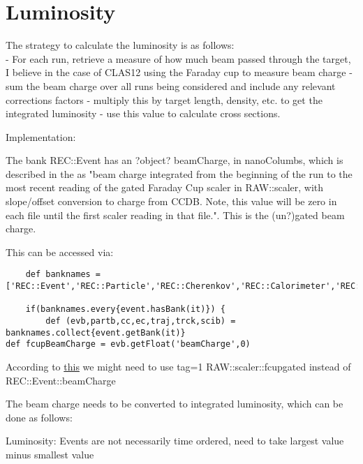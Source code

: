 \section{Luminosity}

The strategy to calculate the luminosity is as follows:\\

 - For each run, retrieve a measure of how much beam passed through the target, I believe in the case of CLAS12 using the Faraday cup to measure beam charge
    - sum the beam charge over all runs being considered and include any relevant corrections factors
    - multiply this by target length, density, etc. to get the integrated luminosity
    - use this value to calculate cross sections.


Implementation:

The bank REC::Event has an ?object? beamCharge, in nanoColumbs, which is described in the \DST as "beam charge integrated from the beginning of the run to the most recent reading of the gated Faraday Cup scaler in RAW::scaler, with slope/offset conversion to charge from CCDB. Note, this value will be zero in each file until the first scaler reading in that file.". This is the (un?)gated beam charge. 


This can be accessed via:

\begin{lstlisting}
	def banknames = ['REC::Event','REC::Particle','REC::Cherenkov','REC::Calorimeter','REC::Traj','REC::Track','REC::Scintillator']

	if(banknames.every{event.hasBank(it)}) {
		def (evb,partb,cc,ec,traj,trck,scib) = banknames.collect{event.getBank(it)}
def fcupBeamCharge = evb.getFloat('beamCharge',0)
\end{lstlisting}

    According to \href{https://clas12.discourse.group/t/accessing-beam-charge-information/239}{this} we might need to use tag=1 RAW::scaler::fcupgated instead of REC::Event::beamCharge
    

The beam charge needs to be converted to integrated luminosity, which can be done as follows:

Luminosity: Events are not necessarily time ordered, need to take largest value minus smallest value  
